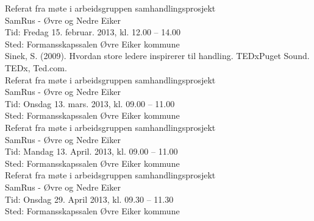\documentclass[11pt]{report} %
\begin{document}
\begin{thebibliography}{99}
                  Referat fra møte i arbeidsgruppen samhandlingsprosjekt\\ 
                  SamRus - Øvre og Nedre Eiker\\
                  Tid: Fredag 15. februar. 2013,  kl. 12.00 – 14.00\\
                  Sted: Formansskapssalen Øvre Eiker kommune\\

                  Sinek, S. (2009). Hvordan store ledere inspirerer til handling. TEDxPuget Sound. TEDx, Ted.com.\\

                  Referat fra møte i arbeidsgruppen samhandlingsprosjekt\\ 
                  SamRus - Øvre og Nedre Eiker\\
                  Tid: Onsdag 13. mars. 2013,  kl. 09.00 – 11.00\\
                  Sted: Formansskapssalen Øvre Eiker kommune\\

                  Referat fra møte i arbeidsgruppen samhandlingsprosjekt\\ 
                  SamRus - Øvre og Nedre Eiker\\
                  Tid: Mandag 13. April. 2013,  kl. 09.00 – 11.00\\
                  Sted: Formansskapssalen Øvre Eiker kommune\\

                  Referat fra møte i arbeidsgruppen samhandlingsprosjekt\\ 
                  SamRus - Øvre og Nedre Eiker\\
                  Tid: Onsdag 29. April 2013,  kl. 09.30 – 11.30\\
                  Sted: Formansskapssalen Øvre Eiker kommune\\
  




              \end{thebibliography}

              \listoffigures
              \listoftables

              
\end{document}
